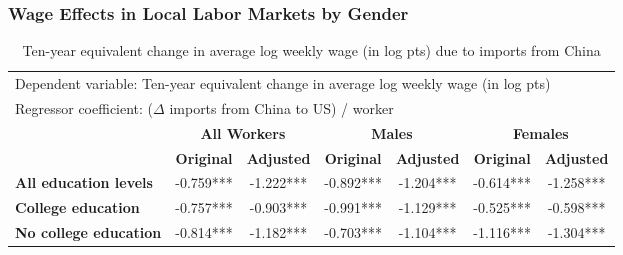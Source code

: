 \begin{frame}
    \frametitle{Wage Effects in Local Labor Markets by Gender}

        \begin{table}[h!]
            \centering
            \begin{adjustbox}{max width=\textwidth}
                \begin{tabular}{l c c c c c c}
                    \toprule
                    \multicolumn{7}{l}{Dependent variable: Ten-year equivalent change in average log weekly wage (in log pts)} \\
                    \multicolumn{7}{l}{Regressor coefficient: ($\Delta$ imports from China to US) / worker} \\
                    \midrule
                    & \multicolumn{2}{c}{\textbf{All Workers}} & \multicolumn{2}{c}{\textbf{Males}} & \multicolumn{2}{c}{\textbf{Females}} \\
                    \cmidrule(lr){2-3} \cmidrule(lr){4-5} \cmidrule(lr){6-7}
                    & \textbf{Original} & \textbf{Adjusted} & \textbf{Original} & \textbf{Adjusted} & \textbf{Original} & \textbf{Adjusted} \\
                    \midrule
                    \textbf{All education levels} & -0.759*** & -1.222*** & -0.892*** & -1.204*** & -0.614*** & -1.258*** \\
                    \textbf{College education} & -0.757*** & -0.903*** & -0.991*** & -1.129*** & -0.525*** & -0.598*** \\
                    \textbf{No college education} & -0.814*** & -1.182*** & -0.703*** & -1.104*** & -1.116*** & -1.304*** \\
                    \bottomrule
                \end{tabular}
            \end{adjustbox}
            \caption{Ten-year equivalent change in average log weekly wage (in log pts) due to imports from China}
            \label{tab:panel_6}
        \end{table}

    \end{frame}
